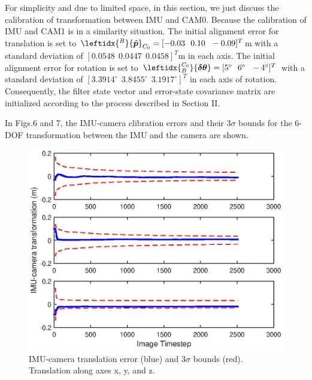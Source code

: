\documentclass[a4paper, 10pt, conference]{ieeeconf}      %
\begin{document}
For simplicity and due to limited space, in this section, we just discuss the calibration of transformation between IMU and CAM0. Because the calibration of IMU and CAM1 is in a similarity situation. The initial alignment error for translation is set to $ {\leftidx{^B}{\tilde  {\bm p}}_{C_0}} = [-0.03 \ \ 0.10 \ \ -0.09]^T $m with a  standard deviation of $ [0.0548 \ \   0.0447  \ \  0.0458]^T $m in each axis. The initial alignment error for rotation is set to $ \leftidx{_B^{C_0}} { \bm {\delta \theta}} = [5^{\circ} \ \ 6^{\circ} \ \ -4^{\circ}]^T $ with a standard deviation of  $ [3.3914^{\circ}  \ \  3.8455^{\circ}  \ \  3.1917^{\circ}]^T $ in each axis of rotation. Consequently, the filter state vector and
error-state covariance matrix are initialized according to the
process described in Section II.





In Figs.6 and 7, the  IMU-camera clibration errors and their $ 3 \sigma $ bounds for the
6-DOF transformation between the IMU and the camera are shown.

\begin{figure}[thpb]
	\centering
	
	\includegraphics[scale=0.5]{trans.eps}
	
	\caption{IMU-camera translation error (blue) and $ 3 \sigma $ bounds (red). Translation along axes x, y, and z. }
	\label{figurelabel}
\end{figure}
\end{document}
